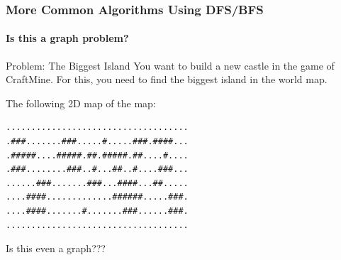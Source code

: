\documentclass{beamer}
\begin{document}
\begin{frame}[fragile]
  \frametitle{More Common Algorithms Using DFS/BFS}
  \framesubtitle{Is this a graph problem?}

  \begin{block}{Problem: The Biggest Island}
    You want to build a new castle in the game of CraftMine. For this,
    you need to find the biggest island in the world map.

    \bigskip

     The following 2D map of the map:
\begin{verbatim}
....................................
.###.......###.....#.....###.####...
.#####....#####.##.#####.##....#....
.###........###..#...##..#....###...
......###.......###...####...##.....
....####.............######.....###.
....####.......#.......###......###.
....................................
\end{verbatim}
  \end{block}

  \bigskip

  Is this even a graph???
\end{frame}
\end{document}
